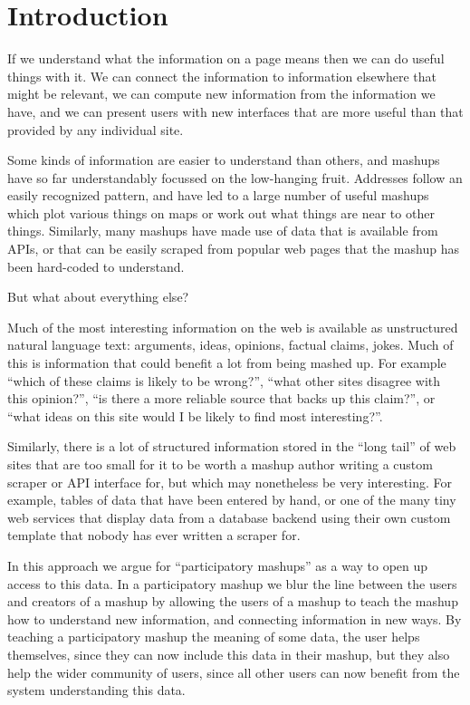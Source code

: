 \documentclass{chi2009}
\begin{document}
\section{Introduction}

If we understand what the information on a page means then we can do useful things with it. We can connect the information to information elsewhere that might be relevant, we can compute new information from the information we have, and we can present users with new interfaces that are more useful than that provided by any individual site. 

Some kinds of information are easier to understand than others, and mashups have so far understandably focussed on the low-hanging fruit. Addresses follow an easily recognized pattern, and have led to a large number of useful mashups which plot various things on maps or work out what things are near to other things. Similarly, many mashups have made use of data that is available from APIs, or that can be easily scraped from popular web pages that the mashup has been hard-coded to understand.

But what about everything else? 

Much of the most interesting information on the web is available as unstructured natural language text: arguments, ideas, opinions, factual claims, jokes. Much of this is information that could benefit a lot from being mashed up. For example ``which of these claims is likely to be wrong?'', ``what other sites disagree with this opinion?'', ``is there a more reliable source that backs up this claim?'', or ``what ideas on this site would I be likely to find most interesting?''.

Similarly, there is a lot of structured information stored in the ``long tail'' of web sites that are too small for it to be worth a mashup author writing a custom scraper or API interface for, but which may nonetheless be very interesting. For example, tables of data that have been entered by hand, or one of the many tiny web services that display data from a database backend using their own custom template that nobody has ever written a scraper for.

In this approach we argue for ``participatory mashups'' as a way to open up access to this data. In a participatory mashup we blur the line between the users and creators of a mashup by allowing the users of a mashup to teach the mashup how to understand new information, and connecting information in new ways. By teaching a participatory mashup the meaning of some data, the user helps themselves, since they can now include this data in their mashup, but they also help the wider community of users, since all other users can now benefit from the system understanding this data.
\end{document}

